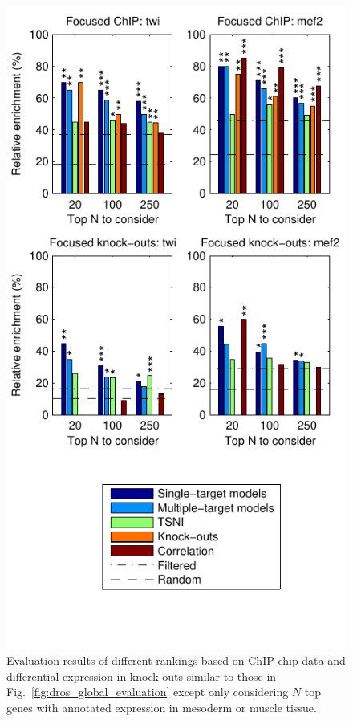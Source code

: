 \documentclass{article}
\begin{document}
\begin{figure}[tb]
  \centering
  \includegraphics[trim=0mm 8mm 0mm 0mm]{dros_focused_evaluation_supplement}
  \caption{Evaluation results of different rankings based on
    ChIP-chip data and differential expression in knock-outs
    similar to those in
    Fig.~\ref{fig:dros_global_evaluation} except only considering
    $N$ top genes
    with annotated expression in mesoderm or muscle tissue.
}
\end{figure}
\end{document}
